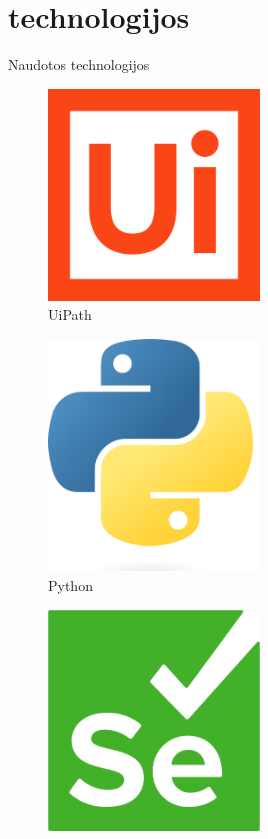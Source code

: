 \section{technologijos}

\begin{frame}[c]{Naudotos technologijos}
    \begin{minipage}{0.32\textwidth}
        \begin{figure}
            \includegraphics[width=0.5\textwidth]{img/UiPath_logo.png}
            \caption{UiPath \cite{uipath}}
        \end{figure}
    \end{minipage}
    \begin{minipage}{0.32\textwidth}
        \begin{figure}
            \includegraphics[width=0.5\textwidth]{img/Python-logo-notext.svg.png}
            \caption{Python \cite{python2021python}}
        \end{figure}
    \end{minipage}
    \begin{minipage}{0.32\textwidth}
        \begin{figure}
            \includegraphics[width=0.5\textwidth]{img/Selenium_Logo.png}

\end{figure}
\end{minipage}
\end{frame}
